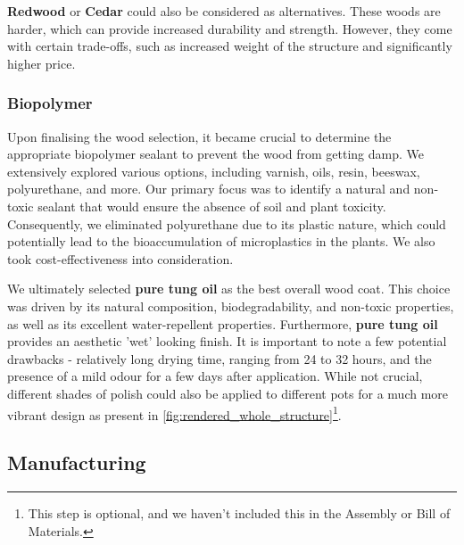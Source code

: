 \documentclass[12pt]{extarticle} %
\begin{document}
\textbf{Redwood} or \textbf{Cedar} could also be considered as alternatives. These woods are harder, which can provide increased durability and strength. However, they come with certain trade-offs, such as increased weight of the structure and significantly higher price.


\subsubsection{Biopolymer}
Upon finalising the wood selection, it became crucial to determine the appropriate biopolymer sealant to prevent the wood from getting damp. We extensively explored various options, including varnish, oils, resin, beeswax, polyurethane, and more. Our primary focus was to identify a natural and non-toxic sealant that would ensure the absence of soil and plant toxicity. Consequently, we eliminated polyurethane due to its plastic nature, which could potentially lead to the bioaccumulation of microplastics in the plants. We also took cost-effectiveness into consideration.

We ultimately selected \textbf{pure tung oil} as the best overall wood coat\cite{tung_oil}. This choice was driven by its natural composition, biodegradability, and non-toxic properties, as well as its excellent water-repellent properties. Furthermore, \textbf{pure tung oil} provides an aesthetic 'wet' looking finish. It is important to note a few potential drawbacks - relatively long drying time, ranging from 24 to 32 hours, and the presence of a mild odour for a few days after application. While not crucial, different shades of polish could also be applied to different pots for a much more vibrant design as present in \ref{fig:rendered_whole_structure}\footnote{This step is optional, and we haven't included this in the Assembly or Bill of Materials.}.

\subsection{Manufacturing}
\end{document}
